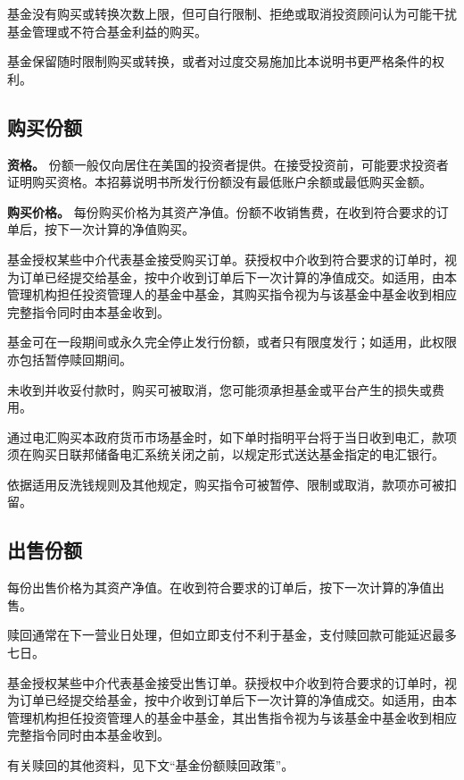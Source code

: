 \documentclass[UTF8,fontset=none,11pt,a4paper]{ctexart}
\begin{document}
基金没有购买或转换次数上限，但可自行限制、拒绝或取消投资顾问认为可能干扰基金管理或不符合基金利\allowbreak\mbox{益的购买。}


基金保留随时限制购买或转换，或者对过度交易施加比本说明书更严格条\allowbreak\mbox{件的权利。}


\subsection*{购买份额}
\textbf{资格。} 份额一般仅向居住在美国的投资者提供。在接受投资前，可能要求投资者证明购买资格。本招募说明书所发行份额没有最低账户余额或最低\allowbreak\mbox{购买金额。}


\textbf{购买价格。} 每份购买价格为其资产净值。份额不收销售费，在收到符合要求的订单后，按下一次计算的\allowbreak\mbox{净值购买。}


基金授权某些中介代表基金接受购买订单。获授权中介收到符合要求的订单时，视为订单已经提交给基金，按中介收到订单后下一次计算的净值成交。如适用，由本管理机构担任投资管理人的基金中基金，其购买指令视为与该基金中基金收到相应完整指令同时由本\allowbreak\mbox{基金收到。}


基金可在一段期间或永久完全停止发行份额，或者只有限度发行；如适用，此权限亦包括暂停\allowbreak\mbox{赎回期间。}


未收到并收妥付款时，购买可被取消，您可能须承担基金或平台产生的损\allowbreak\mbox{失或费用。}


通过电汇购买本政府货币市场基金时，如下单时指明平台将于当日收到电汇，款项须在购买日联邦储备电汇系统关闭之前，以规定形式送达基金指定的\allowbreak\mbox{电汇银行。}


依据适用反洗钱规则及其他规定，购买指令可被暂停、限制或取消，款项亦\allowbreak\mbox{可被扣留。}


\subsection*{出售份额}
每份出售价格为其资产净值。在收到符合要求的订单后，按下一次计算的\allowbreak\mbox{净值出售。}


赎回通常在下一营业日处理，但如立即支付不利于基金，支付赎回款可能延迟\allowbreak\mbox{最多七日。}


基金授权某些中介代表基金接受出售订单。获授权中介收到符合要求的订单时，视为订单已经提交给基金，按中介收到订单后下一次计算的净值成交。如适用，由本管理机构担任投资管理人的基金中基金，其出售指令视为与该基金中基金收到相应完整指令同时由本\allowbreak\mbox{基金收到。}


有关赎回的其他资料，见下文“基金份额\allowbreak\mbox{赎回政策”。}
\end{document}
